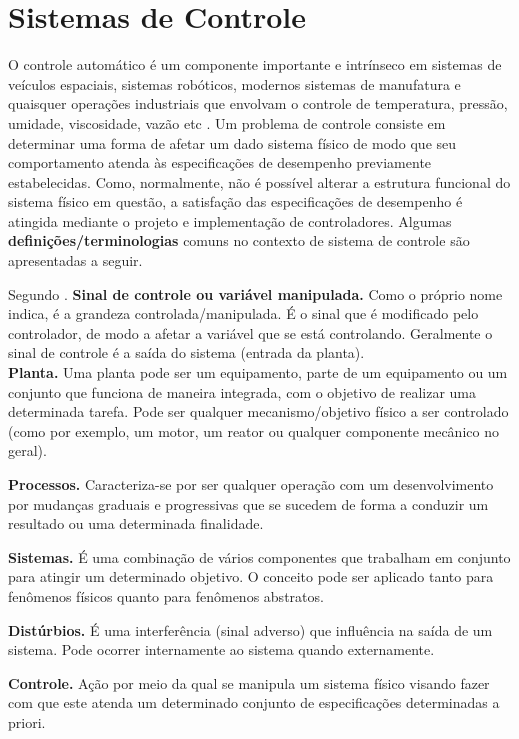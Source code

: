 \section{Sistemas de Controle}
\label{sec:sistema_controle}
O controle automático é um componente importante e intrínseco em sistemas de veículos espaciais, sistemas robóticos, modernos sistemas de manufatura e quaisquer operações industriais que envolvam o controle de temperatura, pressão, umidade, viscosidade, vazão etc \cite{ogata2011engenharia}. Um problema de controle consiste em determinar uma forma de afetar um dado sistema físico de modo que seu comportamento atenda às especificações de desempenho previamente estabelecidas. Como, normalmente, não é possível alterar a estrutura funcional do sistema físico em questão, a satisfação das especificações de desempenho é atingida mediante o projeto e implementação de controladores. Algumas \textbf{definições/terminologias} comuns no contexto de sistema de controle são apresentadas a seguir.

Segundo \cite{ogata2011engenharia}.
\textbf{Sinal de controle ou variável manipulada.} Como o próprio nome indica, é a grandeza controlada/manipulada. É o sinal que é modificado pelo controlador, de modo a afetar a variável que se está controlando. Geralmente o sinal de controle é a saída do sistema (entrada da planta).\\

\textbf{Planta.} Uma planta pode ser um equipamento, parte de um equipamento ou um conjunto que funciona de maneira integrada, com o objetivo de realizar uma determinada tarefa. Pode ser qualquer mecanismo/objetivo físico a ser controlado (como por exemplo, um motor, um reator ou qualquer componente mecânico no geral).

\textbf{Processos.} Caracteriza-se por ser qualquer operação com um desenvolvimento por mudanças graduais e progressivas que se sucedem de forma a conduzir um resultado ou uma determinada finalidade.

\textbf{Sistemas.} É uma combinação de vários componentes que trabalham em conjunto para atingir um determinado objetivo. O conceito pode ser aplicado tanto para fenômenos físicos quanto para fenômenos abstratos.

\textbf{Distúrbios.} É uma interferência (sinal adverso) que influência na saída de um sistema. Pode ocorrer internamente ao sistema quando externamente.


\textbf{Controle.} Ação por meio da qual se manipula um sistema físico visando fazer com que este atenda um determinado conjunto de especificações determinadas a priori.

